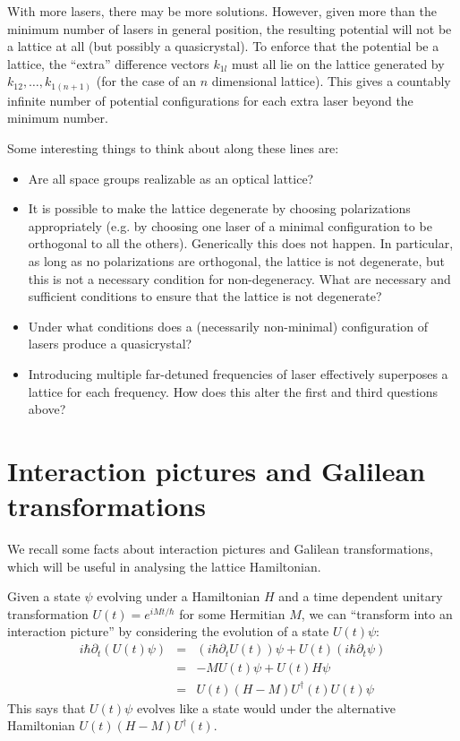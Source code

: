 \documentclass[aps,prb,floatfix,amsmath,amssymb,groupedaddress]{revtex4}
\begin{document}
With more lasers, there may be more solutions.  However, given more than the minimum number of lasers in general position, the resulting potential will not be a lattice at all (but possibly a quasicrystal).  To enforce that the potential be a lattice, the ``extra'' difference vectors $k_{1l}$ must all lie on the lattice generated by $k_{12},\dots,k_{1(n+1)}$ (for the case of an $n$ dimensional lattice).  This gives a countably infinite number of potential configurations for each extra laser beyond the minimum number. 

Some interesting things to think about along these lines are: 
\begin{itemize}
\item Are all space groups realizable as an optical lattice?
\item It is possible to make the lattice degenerate by choosing polarizations appropriately (e.g. by choosing one laser of a minimal configuration to be orthogonal to all the others).  Generically this does not happen.  In particular, as long as no polarizations are orthogonal, the lattice is not degenerate, but this is not a necessary condition for non-degeneracy.  What are necessary and sufficient conditions to ensure that the lattice is not degenerate?
\item Under what conditions does a (necessarily non-minimal) configuration of lasers produce a quasicrystal?
\item Introducing multiple far-detuned frequencies of laser effectively superposes a lattice for each frequency.  How does this alter the first and third questions above?
\end{itemize}

\section{Interaction pictures and Galilean transformations} %
We recall some facts about interaction pictures and Galilean transformations, which will be useful in analysing the lattice Hamiltonian.

Given a state $\psi$ evolving under a Hamiltonian $H$ and a time dependent unitary transformation $U(t) = e^{i M t/\hbar}$ for some Hermitian $M$, we can ``transform into an interaction picture'' by considering the evolution of a state $U(t) \psi$:
\begin{eqnarray*}
i\hbar\partial_t \left(U(t) \psi\right) & = & \left(i\hbar\partial_t U(t)\right) \psi + U(t) \left(i\hbar\partial_t \psi\right) \\
& = & - M U(t) \psi + U(t) H \psi \\
& = & U(t) \left(H-M\right)U^\dagger(t) U(t)\psi
\end{eqnarray*}
This says that $U(t)\psi$ evolves like a state would under the alternative Hamiltonian $U(t) \left(H-M\right)U^\dagger(t)$.  
\end{document}
